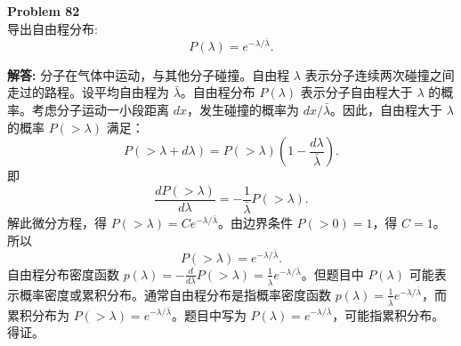 \documentclass[12pt, a4paper, oneside]{ctexart}
\newenvironment{solution}{\par\noindent\textbf{解答:}\quad}{\par}
\begin{document}
\begin{mdframed}[backgroundcolor=gray!10, linewidth=0pt]
    \textbf{Problem 82} \\
    导出自由程分布:
    \[
    P(\lambda) = e^{-\lambda / \bar{\lambda}}.
    \]
\end{mdframed}
\begin{solution}
    分子在气体中运动，与其他分子碰撞。自由程 $\lambda$ 表示分子连续两次碰撞之间走过的路程。设平均自由程为 $\bar{\lambda}$。自由程分布 $P(\lambda)$ 表示分子自由程大于 $\lambda$ 的概率。考虑分子运动一小段距离 $dx$，发生碰撞的概率为 $dx / \bar{\lambda}$。因此，自由程大于 $\lambda$ 的概率 $P(>\lambda)$ 满足：
    \[
    P(>\lambda + d\lambda) = P(>\lambda) \left(1 - \frac{d\lambda}{\bar{\lambda}}\right).
    \]
    即
    \[
    \frac{dP(>\lambda)}{d\lambda} = -\frac{1}{\bar{\lambda}} P(>\lambda).
    \]
    解此微分方程，得 $P(>\lambda) = C e^{-\lambda / \bar{\lambda}}$。由边界条件 $P(>0) = 1$，得 $C=1$。所以
    \[
    P(>\lambda) = e^{-\lambda / \bar{\lambda}}.
    \]
    自由程分布密度函数 $p(\lambda) = -\frac{d}{d\lambda} P(>\lambda) = \frac{1}{\bar{\lambda}} e^{-\lambda / \bar{\lambda}}$。但题目中 $P(\lambda)$ 可能表示概率密度或累积分布。通常自由程分布是指概率密度函数 $p(\lambda) = \frac{1}{\bar{\lambda}} e^{-\lambda / \bar{\lambda}}$，而累积分布为 $P(>\lambda) = e^{-\lambda / \bar{\lambda}}$。题目中写为 $P(\lambda) = e^{-\lambda / \bar{\lambda}}$，可能指累积分布。得证。
\end{solution}
\end{document}
